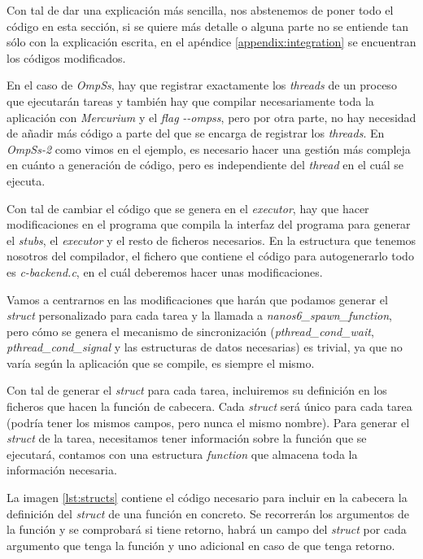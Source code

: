 Con tal de dar una explicación más sencilla, nos abstenemos de poner todo el código en esta sección, si se quiere más detalle o alguna parte no se entiende tan sólo con la explicación escrita, en el apéndice \ref{appendix:integration} se encuentran los códigos modificados. 
\par\bigskip
En el caso de \textit{OmpSs}, hay que registrar exactamente los \textit{threads} de un proceso que ejecutarán tareas y también hay que compilar necesariamente toda la aplicación con \textit{Mercurium} y el \textit{flag} \textit{-{}-ompss}, pero por otra parte, no hay necesidad de añadir más código a parte del que se encarga de registrar los \textit{threads}. En \textit{OmpSs-2} como vimos en el ejemplo, es necesario hacer una gestión más compleja en cuánto a generación de código, pero es independiente del \textit{thread} en el cuál se ejecuta.
\par\bigskip
Con tal de cambiar el código que se genera en el \textit{executor}, hay que hacer modificaciones en el programa que compila la interfaz del programa para generar el \textit{stubs}, el \textit{executor} y el resto de ficheros necesarios. En la estructura que tenemos nosotros del compilador, el fichero que contiene el código para autogenerarlo todo es \textit{c-backend.c}, en el cuál deberemos hacer unas modificaciones.
\par\smallskip
Vamos a centrarnos en las modificaciones que harán que podamos generar el \textit{struct} personalizado para cada tarea y la llamada a \textit{nanos6\_spawn\_function}, pero cómo se genera el mecanismo de sincronización (\textit{pthread\_cond\_wait}, \textit{pthread\_cond\_signal} y las estructuras de datos necesarias) es trivial, ya que no varía según la aplicación que se compile, es siempre el mismo.
\par\bigskip
Con tal de generar el \textit{struct} para cada tarea, incluiremos su definición en los ficheros que hacen la función de cabecera. Cada \textit{struct} será único para cada tarea (podría tener los mismos campos, pero nunca el mismo nombre). Para generar el \textit{struct} de la tarea, necesitamos tener información sobre la función que se ejecutará, contamos con una estructura \textit{function} que almacena toda la información necesaria.
\bigskip

La imagen \ref{lst:structs} contiene el código necesario para incluir en la cabecera la definición del \textit{struct} de una función en concreto. Se recorrerán los argumentos de la función y se comprobará si tiene retorno, habrá un campo del \textit{struct} por cada argumento que tenga la función y uno adicional en caso de que tenga retorno.
\bigskip

